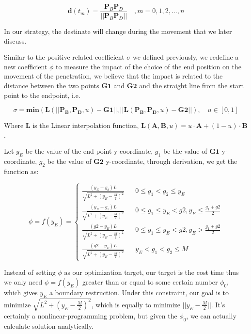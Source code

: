 \documentclass{mcmthesis}
\begin{document}
\begin{equation}
\mathbf{d}(t_m)=\frac{\mathbf{P}_B \mathbf{P}_D}{\vert \vert \mathbf{P}_B \mathbf{P}_D \vert \vert} \quad ,m = 0, 1, 2, ..., n
\end{equation}

In our strategy, the destinate will change during the movement that we later discuss. \par

Similar to the positive related coefficient $\sigma$ we defined previously,  we redefine a new coefficient $\phi$ to measure the impact of the choice of the end position on the movement of the penetration,  we believe that the impact is related to the distance between the two points $\mathbf{G1}$ and $\mathbf{G2}$ and the straight line from the start point to the endpoint, i.e.

\begin{equation}
\sigma = \mathbf{min}(\mathbf{L}(\vert \vert \mathbf{P_B}, \mathbf{P_D}, u) - \mathbf{G1} \lvert \lvert, \lvert \lvert \mathbf{L}(\mathbf{P_B}, \mathbf{P_D}, u) - \mathbf{G2} \lvert \lvert), \quad u \in [0, 1]
\end{equation}

Where \textbf{L} is the Linear interpolation function, $\mathbf{L}(\mathbf{A}, \mathbf{B}, u) = u \cdot \mathbf{A} + (1 - u) \cdot \mathbf{B}$. \par

Let $y_E$ be the value of the end point y-coordinate, $g_1$ be the value of $\mathbf{G1}$ y-coordinate, $g_2$ be the value of $\mathbf{G2}$ y-coordinate, through derivation, we get the function as:

\begin{equation}
\phi=f(y_E)=\left\{
\begin{array}{rcl}
\frac{(y_E - g_2)L}{\sqrt{L^2+(y_E-\frac{M}{2})^2}} & & 0 \leq g_1 < g_2 \leq y_E \\  
\frac{(y_E - g_1)L}{\sqrt{L^2+(y_E-\frac{M}{2})^2}} & & 0 \leq g_1 \leq y_E < g2, y_E \leq \frac{g_1 + g2}{2}\\
\frac{(g2 - y_E)L}{\sqrt{L^2+(y_E-\frac{M}{2})^2}} & & 0 \leq g_1 \leq y_E < g2, y_E > \frac{g_1 + g2}{2}\\ 
\frac{(g2 - y_E)L}{\sqrt{L^2+(y_E-\frac{M}{2})^2}} & & y_E < g_1 < g_2 \leq M
\end{array} \right.
\end{equation}

Instead of setting $\phi$ as our optimization target, our target is the cost time thus we only need $\phi = f(y_E)$ greater than or equal to some certain number $\phi_0$, which gives $y_E$ a boundary restruction. Under this constraint, our goal is to minimize $\sqrt{L^2+(y_E - \frac{M}{2})^2}$, which is equally to minimize $\vert \vert y_E - \frac{M}{2} \vert \vert$. It's certainly a nonlinear-programming problem, but given the $\phi_0$, we can actually calculate solution analytically. \par
\end{document}
